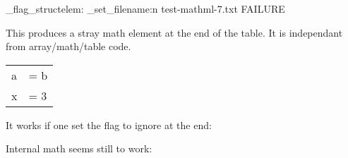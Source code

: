 \documentclass{article}
\begin{document}
\ExplSyntaxOn
\luamml_flag_structelem:  \luamml_set_filename:n {test-mathml-7.txt} 
\ExplSyntaxOff
FAILURE

This produces a stray math element at the end of the table. It is independant 
from array/math/table code.

 
\begin{tabular}{ll}
a & = b \\
x & = 3
\end{tabular}

It works if one set the flag to ignore at the end:

\makeatletter 
\ExplSyntaxOn
\def\endtabular{\endarray\m@th\luamml_flag_ignore: $\egroup}
\ExplSyntaxOff


Internal math seems still to work:
\end{document}
